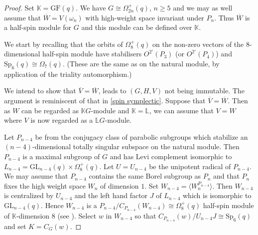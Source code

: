 \documentclass[12pt]{amsart}
\theoremstyle{remark}
\theoremstyle{notation}
\theoremstyle{definition}
\newcommand{\GF}{\mathrm{GF}}
\newcommand{\GL}{\mathrm{GL}}
\newcommand{\Sp}{\mathrm{Sp}}
\newcommand{\0}{\emptyset}
\begin{document}
\begin{proof} Set  $\mathbb K=\GF(q)$. We have $G \cong \Omega_{2n}^+(q)$, $n \ge 5$ and we may as well assume that $\overline W=V(\omega_{n})$ with high-weight space invariant under $P_n$. Thus $\overline W$ is a half-spin module for $G$ and this module can be defined over $\mathbb K$.

We start by recalling that the orbits of $\Omega_8^+(q)$ on the non-zero vectors of the $8$-dimensional half-spin module have stabilisers $O^{2'}(P_3)$ (or $O^{2'}(P_4)$) and $ \Sp_6(q)\cong \Omega_7(q)$. (These are the same as on the natural module, by application of the triality automorphism.)

We intend to show that $\overline V=\overline W$, leads to $(G,H,V)$ not being immutable. The argument is reminiscent of that in \cref{spin symplectic}. Suppose that $\overline V=\overline W$. Then as $W$ can be regarded as $\mathbb KG$-module and $\mathbb K=\mathbb L$, we can assume that $V= W$ where $V$ is now regarded as a $\mathbb LG$-module.



Let $P_{n-4}$ be  from the conjugacy class of parabolic subgroups which stabilize an $(n-4)$-dimensional totally singular subspace on the natural module. Then $P_{n-4}$ is a maximal subgroup of $G$ and has  Levi complement isomorphic to $L_{n-4}=\GL_{n-4}(q) \times \Omega_8^+(q)$.  Let $U= U_{n-4}$ be the unipotent radical of $P_{n-4}$.   We may assume that $P_{n-4}$ contains the same Borel subgroup as $P_n$ and that $P_n$ fixes the high weight space $W_n$ of  dimension $1$.  Set $W_{n-4}= \langle W_n^{P_{n-4}}\rangle$.  Then $W_{n-4}$ is centralized by $U_{n-4}$ and the left hand factor $J$ of $L_{n-4}$ which is isomorphic to $\GL_{n-4}(q)$. Hence $W_{n-4}$ is a $P_{n-4}/C_{P_{n-4}}(W_{n-4})\cong \Omega_8^+(q)$ half-spin module of $\mathbb K$-dimension $8$ (see \cite[Theorem 6.1]{PR03}). Select $w$ in $W_{n-4}$ so that $C_{P_{n-4}}(w)/U_{n-4}J \cong \Sp_6(q)$ and set $K= C_{G}(w)$.


\end{proof}
\end{document}
